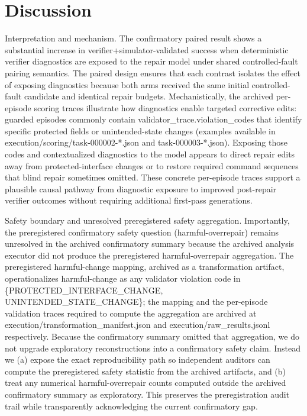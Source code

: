 \documentclass[conference]{IEEEtran}
\begin{document}
\section{Discussion}
Interpretation and mechanism. The confirmatory paired result shows a substantial increase in verifier+simulator-validated success when deterministic verifier diagnostics are exposed to the repair model under shared controlled-fault pairing semantics. The paired design ensures that each contrast isolates the effect of exposing diagnostics because both arms received the same initial controlled-fault candidate and identical repair budgets. Mechanistically, the archived per-episode scoring traces illustrate how diagnostics enable targeted corrective edits: guarded episodes commonly contain validator\_trace.violation\_codes that identify specific protected fields or unintended-state changes (examples available in execution/scoring/task-000002-*.json and task-000003-*.json). Exposing those codes and contextualized diagnostics to the model appears to direct repair edits away from protected-interface changes or to restore required command sequences that blind repair sometimes omitted. These concrete per-episode traces support a plausible causal pathway from diagnostic exposure to improved post-repair verifier outcomes without requiring additional first-pass generations.

Safety boundary and unresolved preregistered safety aggregation. Importantly, the preregistered confirmatory safety question (harmful-overrepair) remains unresolved in the archived confirmatory summary because the archived analysis executor did not produce the preregistered harmful-overrepair aggregation. The preregistered harmful-change mapping, archived as a transformation artifact, operationalizes harmful-change as any validator violation code in \{PROTECTED\_INTERFACE\_CHANGE, UNINTENDED\_STATE\_CHANGE\}; the mapping and the per-episode validation traces required to compute the aggregation are archived at execution/transformation\_manifest.json and execution/raw\_results.jsonl respectively. Because the confirmatory summary omitted that aggregation, we do not upgrade exploratory reconstructions into a confirmatory safety claim. Instead we (a) expose the exact reproducibility path so independent auditors can compute the preregistered safety statistic from the archived artifacts, and (b) treat any numerical harmful-overrepair counts computed outside the archived confirmatory summary as exploratory. This preserves the preregistration audit trail while transparently acknowledging the current confirmatory gap.
\end{document}
